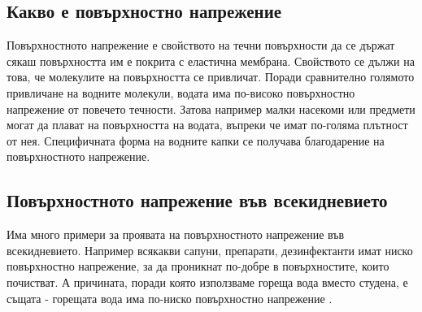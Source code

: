 \documentclass{article}
\begin{document}
\subsection{Какво е повърхностно напрежение}
Повърхностното напрежение е свойството на течни повърхности да се държат сякаш повърхността им е покрита с еластична мембрана. Свойството се дължи на това, че молекулите на повърхността се привличат. Поради сравнително голямото привличане на водните молекули, водата има по-високо повърхностно напрежение от повечето течности. Затова например малки насекоми или предмети могат да плават на повърхността на водата, въпреки че имат по-голяма плътност от нея. Специфичната форма на водните капки се получава благодарение на повърхностното напрежение. 
\subsection{Повърхностното напрежение във всекидневието}
Има много примери за проявата на повърхностното напрежение във всекидневието. Например всякакви сапуни, препарати, дезинфектанти имат ниско повърхностно напрежение, за да проникнат по-добре в повърхностите, които почистват. А причината, поради която използваме гореща вода вместо студена, е същата - горещата вода има по-ниско повърхностно напрежение \cite{surfsource}.
\end{document}
